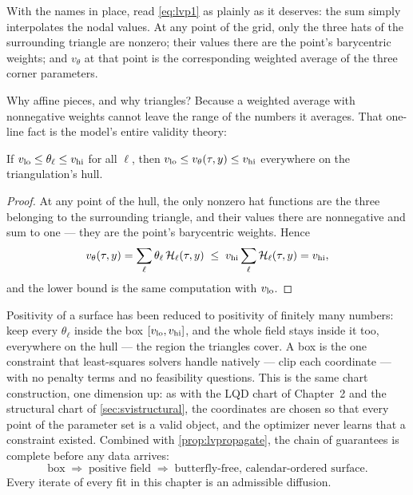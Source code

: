 With the names in place, read \eqref{eq:lvp1} as plainly as it
deserves: the sum simply interpolates the nodal values.  At any point
of the grid, only the three hats of the surrounding triangle are
nonzero; their values there are the point's barycentric weights; and
$v_\theta$ at that point is the corresponding weighted average of the
three corner parameters.

Why affine pieces, and why triangles?  Because a weighted average with
nonnegative weights cannot leave the range of the numbers it
averages.  That one-line fact is the model's entire validity theory:

\begin{proposition}
\label{prop:lvnodal}
If $v_{\rm lo}\le\theta_\ell\le v_{\rm hi}$ for all $\ell$, then
$v_{\rm lo}\le v_\theta(\tau,y)\le v_{\rm hi}$ everywhere on the
triangulation's hull.
\end{proposition}

\begin{proof}
At any point of the hull, the only nonzero hat functions are the three
belonging to the surrounding triangle, and their values there are
nonnegative and sum to one --- they are the point's barycentric
weights.  Hence
\[
v_\theta(\tau,y)
=\sum_{\ell}\theta_\ell\,\mathcal H_\ell(\tau,y)
\;\le\;v_{\rm hi}\sum_{\ell}\mathcal H_\ell(\tau,y)
=v_{\rm hi},
\]
and the lower bound is the same computation with $v_{\rm lo}$.
\end{proof}

Positivity of a surface has been reduced to positivity of finitely
many numbers: keep every $\theta_\ell$ inside the box
$[v_{\rm lo},v_{\rm hi}]$, and the whole field stays inside it too,
everywhere on the hull --- the region the triangles cover.  A
box is the one constraint that least-squares solvers handle natively
--- clip each coordinate --- with no penalty terms and no feasibility
questions.  This is the same chart construction, one dimension up: as with the
LQD chart of Chapter~2 and the structural chart of
\cref{sec:svistructural}, the coordinates are chosen so that every
point of the parameter set is a valid object, and the optimizer never
learns that a constraint existed.  Combined with
\cref{prop:lvpropagate}, the chain of guarantees is complete before
any data arrives:
\[
\text{box}\;\Longrightarrow\;\text{positive field}
\;\Longrightarrow\;\text{butterfly-free, calendar-ordered surface.}
\]
Every iterate of every fit in this chapter is an admissible diffusion.


